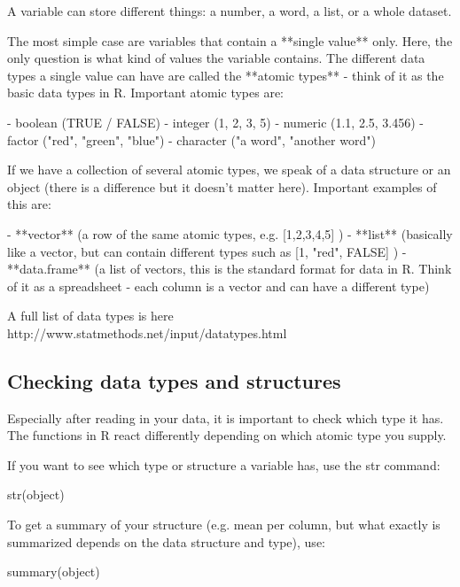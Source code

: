 \documentclass[a4paper,twoside]{tufte-book}\usepackage[]{graphicx}\usepackage[]{color}
\begin{document}
\begin{appendices}
A variable can store different things: a number, a word, a list, or a whole dataset. 

The most simple case are variables that contain a **single value** only. Here, the only question is what kind of values the variable contains. The different data types a single value can have are called the **atomic types** - think of it as the basic data types in R. Important atomic types are: 

- boolean (TRUE / FALSE)
- integer (1, 2, 3, 5)
- numeric (1.1, 2.5, 3.456)
- factor ("red", "green", "blue")
- character ("a word", "another word")

If we have a collection of several atomic types, we speak of a data structure or an object (there is a difference but it doesn't matter here). Important examples of this are: 

- **vector** (a row of the same atomic types, e.g. [1,2,3,4,5] )
- **list** (basically like a vector, but can contain different types such as [1, "red", FALSE] )
- **data.frame** (a list of vectors, this is the standard format for data in R. Think of it as a spreadsheet - each column is a vector and can have a different type)

A full list of data types is here http://www.statmethods.net/input/datatypes.html 
 
\subsection{Checking data types and structures}

Especially after reading in your data, it is important to check which type it has. The functions in R react differently depending on which atomic type you supply. 

If you want to see which type or structure a variable has, use the str command:

\begin{Schunk}
\begin{Sinput}
str(object)
\end{Sinput}
\end{Schunk}

To get a summary of your structure (e.g. mean per column, but what exactly is summarized depends on the data structure and type), use:

\begin{Schunk}
\begin{Sinput}
summary(object)
\end{Sinput}
\end{Schunk}


\end{appendices}
\end{document}
